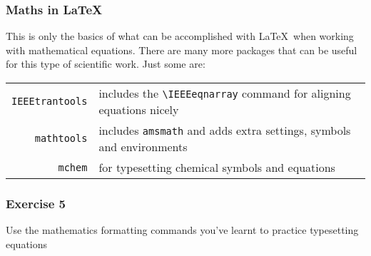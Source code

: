 \documentclass[mathserif]{beamer}
\begin{document}
\begin{frame}[fragile]
\frametitle{Maths in \LaTeX}
\vfill
This is only the basics of what can be accomplished with \LaTeX\ when working with mathematical equations.
\vfill
There are many more packages that can be useful for this type of scientific work. Just some are:
\vfill
\begin{center}
\begin{tabular}{r | p{} | }
	\texttt{IEEEtrantools} & includes the \texttt{{\textbackslash}IEEEeqnarray} command for aligning equations nicely\\
	\texttt{mathtools} & includes \texttt{amsmath} and adds extra settings, symbols and environments \\		
	\texttt{mchem} & for typesetting chemical symbols and equations \\		
\end{tabular}
\end{center}
\vfill
\end{frame}

\begin{frame}
\frametitle{Exercise 5}

\begin{center}
\vfill
Use the mathematics formatting commands you've learnt to practice typesetting equations
\vfill
\end{center}
\end{frame}
\end{document}
